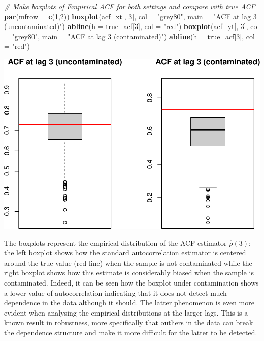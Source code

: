 \documentclass[]{book}
\newenvironment{Shaded}{\begin{snugshade}}{\end{snugshade}}
\newcommand{\CommentTok}[1]{\textcolor[rgb]{0.56,0.35,0.01}{\textit{#1}}}
\newcommand{\DataTypeTok}[1]{\textcolor[rgb]{0.13,0.29,0.53}{#1}}
\newcommand{\DecValTok}[1]{\textcolor[rgb]{0.00,0.00,0.81}{#1}}
\newcommand{\KeywordTok}[1]{\textcolor[rgb]{0.13,0.29,0.53}{\textbf{#1}}}
\newcommand{\NormalTok}[1]{#1}
\newcommand{\StringTok}[1]{\textcolor[rgb]{0.31,0.60,0.02}{#1}}
\theoremstyle{definition}
\theoremstyle{definition}
\theoremstyle{definition}
\theoremstyle{remark}
\begin{document}
\begin{Shaded}
\begin{Highlighting}[]
\CommentTok{# Make boxplots of Empirical ACF for both settings and compare with true ACF}
\KeywordTok{par}\NormalTok{(}\DataTypeTok{mfrow =} \KeywordTok{c}\NormalTok{(}\DecValTok{1}\NormalTok{,}\DecValTok{2}\NormalTok{))}
\KeywordTok{boxplot}\NormalTok{(acf_xt[, }\DecValTok{3}\NormalTok{], }\DataTypeTok{col =} \StringTok{"grey80"}\NormalTok{, }\DataTypeTok{main =} \StringTok{"ACF at lag 3 (uncontaminated)"}\NormalTok{)}
\KeywordTok{abline}\NormalTok{(}\DataTypeTok{h =}\NormalTok{ true_acf[}\DecValTok{3}\NormalTok{], }\DataTypeTok{col =} \StringTok{"red"}\NormalTok{)}
\KeywordTok{boxplot}\NormalTok{(acf_yt[, }\DecValTok{3}\NormalTok{], }\DataTypeTok{col =} \StringTok{"grey80"}\NormalTok{, }\DataTypeTok{main =} \StringTok{"ACF at lag 3 (contaminated)"}\NormalTok{)}
\KeywordTok{abline}\NormalTok{(}\DataTypeTok{h =}\NormalTok{ true_acf[}\DecValTok{3}\NormalTok{], }\DataTypeTok{col =} \StringTok{"red"}\NormalTok{)}
\end{Highlighting}
\end{Shaded}

\includegraphics{ts_files/figure-latex/simulationRobust-1.pdf}

The boxplots represent the empirical distribution of the ACF estimator
\(\hat{\rho}(3)\): the left boxplot shows how the standard
autocorrelation estimator is centered around the true value (red line)
when the sample is not contaminated while the right boxplot shows how
this estimate is considerably biased when the sample is contaminated.
Indeed, it can be seen how the boxplot under contamination shows a lower
value of autocorrelation indicating that it does not detect much
dependence in the data although it should. The latter phenomenon is even
more evident when analysing the empirical distributions at the larger
lags. This is a known result in robustness, more specifically that
outliers in the data can break the dependence structure and make it more
difficult for the latter to be detected.
\end{document}
